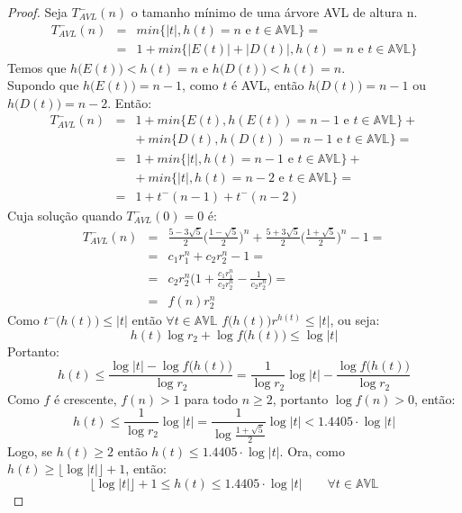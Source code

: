 \documentclass[a4paper,11pt]{article}
\theoremstyle{definition} \newtheorem{definicao}{Def}
\theoremstyle{definition} \newtheorem{exemplo}{Exemplo}
\theoremstyle{plain}      \newtheorem{teorema}{Teorema}
\theoremstyle{remark}     \newtheorem*{corolario}{Corol\'{a}rio}
\begin{document}
\begin{proof}
Seja $T_{AVL}^{-}(n)$ o tamanho m\'{i}nimo de uma \'{a}rvore AVL de
altura n.
\begin{eqnarray*}
T_{AVL}^{-}(n)&=& min\{|t|,h(t)=n \text{ e } t \in \mathbb{AVL}\}=\\
& = & 1+min \{|E(t)|+|D(t)|, h(t) = n \text{ e } t \in \mathbb{AVL}\}
\end{eqnarray*}
Temos que $h\big(E(t)\big) < h(t) = n$ e $h\big(D(t)\big) < h(t) = n$. \\
Supondo que $h\big(E(t)\big) = n - 1$, como $t$ \'{e} AVL, ent\~{a}o
$h\big(D(t)\big) = n - 1$ ou $h\big(D(t)\big) = n - 2$. Ent\~{a}o:
\begin{eqnarray*}
T_{AVL}^{-}(n)&=&1+min\{E(t),h(E(t))=n-1\text{ e } t \in \mathbb{AVL}\}+\\
&& +\: min\{D(t),h(D(t))=n-1\text{ e } t \in \mathbb{AVL}\} = \\
& = & 1 + min \{|t|, h(t) = n - 1 \text{ e } t \in \mathbb{AVL}\} +\\
&& +\: min \{|t|, h(t) = n - 2 \text{ e } t \in \mathbb{AVL}\} = \\
& = & 1 + t^{-}(n-1) + t^{-}(n-2)
\end{eqnarray*}
Cuja solu\c{c}\~{a}o quando $T_{AVL}^{-}(0) = 0$ \'{e}:
\begin{eqnarray*}
T_{AVL}^{-}(n)&=&\frac{5-3\sqrt{5}}{2}\Big(\frac{1-\sqrt{5}}{2}\Big)^n+
\frac{5+3\sqrt{5}}{2}\Big(\frac{1+\sqrt{5}}{2}\Big)^n - 1 = \\
& = & c_1r_1^n + c_2r_2^n - 1 = \\
&=&c_2r_2^n\Big(1+\frac{c_1r_1^n}{c_2r_2^n}-\frac{1}{c_2r_2^n}\Big)=\\
& = & f(n)r_2^n
\end{eqnarray*}
Como $t^{-}\big(h(t)\big)\leq|t|$ ent\~{a}o $\forall t \in \mathbb{AVL}$
$f\big(h(t)\big)r^{h(t)} \leq |t|$, ou seja:
\begin{equation*}
h(t)\log r_2 + \log f\big(h(t)\big) \leq \log |t|
\end{equation*}
Portanto:
\begin{equation*}
h(t) \leq \frac{\log |t| - \log f\big(h(t)\big)}{\log r_2} = 
\frac{1}{\log r_2} \log |t| - \frac{\log f\big(h(t)\big)}{\log r_2}
\end{equation*}
Como $f$ \'{e} crescente, $f(n) > 1$ para todo $n \geq 2$, portanto
$\log f(n) > 0$, ent\~{a}o:
\begin{equation*}
h(t) \leq \frac{1}{\log r_2} \log |t| =
\frac{1}{\log{\frac{1+\sqrt{5}}{2}}} \log |t| < 1.4405 \cdot \log |t|
\end{equation*}
Logo, se $h(t) \geq 2$ ent\~{a}o $h(t) \leq 1.4405 \cdot \log |t|$.
Ora, como $h(t) \geq \lfloor \log |t| \rfloor + 1$, ent\~{a}o:
\begin{equation*}
\lfloor \log|t| \rfloor + 1 \leq h(t) \leq 1.4405 \cdot \log|t|
\qquad \forall t \in \mathbb{AVL}
\end{equation*}
\end{proof}
\end{document}
